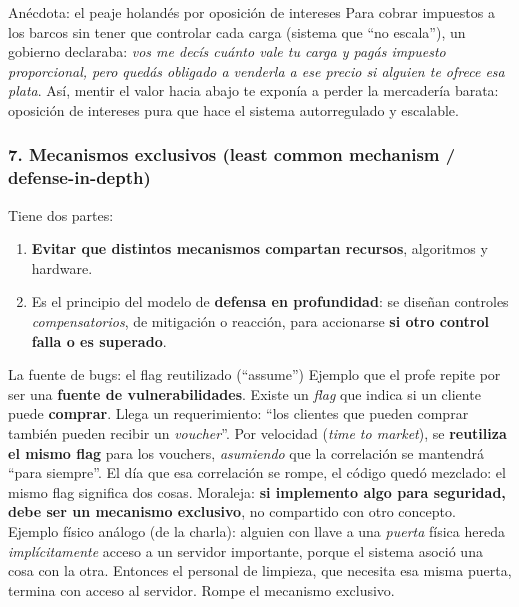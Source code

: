 \documentclass[11pt,a4paper]{article}
\begin{document}
\begin{practbox}{Anécdota: el peaje holandés por oposición de intereses}
Para cobrar impuestos a los barcos sin tener que controlar cada carga (sistema que ``no
escala''), un gobierno declaraba: \emph{vos me decís cuánto vale tu carga y pagás impuesto
proporcional, pero quedás obligado a venderla a ese precio si alguien te ofrece esa plata}.
Así, mentir el valor hacia abajo te exponía a perder la mercadería barata: oposición de
intereses pura que hace el sistema autorregulado y escalable.
\end{practbox}

\subsubsection{7. Mecanismos exclusivos (least common mechanism / defense-in-depth)}
Tiene dos partes:
\begin{enumerate}[leftmargin=1.6em,itemsep=1pt]
  \item \textbf{Evitar que distintos mecanismos compartan recursos}, algoritmos y hardware.
  \item Es el principio del modelo de \textbf{defensa en profundidad}: se diseñan controles
        \emph{compensatorios}, de mitigación o reacción, para accionarse \textbf{si otro
        control falla o es superado}.
\end{enumerate}

\begin{warnbox}{La fuente de bugs: el flag reutilizado (``assume'')}
Ejemplo que el profe repite por ser una \textbf{fuente de vulnerabilidades}. Existe un
\emph{flag} que indica si un cliente puede \textbf{comprar}. Llega un requerimiento: ``los
clientes que pueden comprar también pueden recibir un \emph{voucher}''. Por velocidad
(\emph{time to market}), se \textbf{reutiliza el mismo flag} para los vouchers, \emph{asumiendo}
que la correlación se mantendrá ``para siempre''. El día que esa correlación se rompe, el
código quedó mezclado: el mismo flag significa dos cosas. Moraleja: \textbf{si implemento algo
para seguridad, debe ser un mecanismo exclusivo}, no compartido con otro concepto.\\[3pt]
Ejemplo físico análogo (de la charla): alguien con llave a una \emph{puerta} física hereda
\emph{implícitamente} acceso a un servidor importante, porque el sistema asoció una cosa con la
otra. Entonces el personal de limpieza, que necesita esa misma puerta, termina con acceso al
servidor. Rompe el mecanismo exclusivo.
\end{warnbox}
\end{document}
